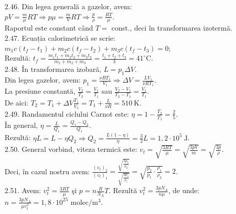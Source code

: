 2.46. Din legea generală a gazelor, avem:\\ $p V=\frac{m}{\mu} R T \Rightarrow p \mu=\frac{m}{V} R T \Rightarrow \frac{p}{\rho}=\frac{R T}{\mu}$.\\ Raportul este constant când $T=$ const., deci în transformarea izotermă.\\

2.47. Ecuația calorimetrică se scrie:\\ $m_{1} c\left(t_{f}-t_{1}\right)+m_{2} c\left(t_{f}-t_{2}\right)+m_{3} c\left(t_{f}-t_{3}\right)=0$;\\ Rezultă: $t_{f}=\frac{m_{1} t_{1}+m_{2} t_{2}+m_{3} t_{3}}{m_{1}+m_{2}+m_{3}}=\frac{t_{1}+t_{2}+t_{3}}{3}=41^{\circ} \mathrm{C}$.\\

2.48. În transformarea izobară, $L=p_{1} \Delta V$.\\ Din legea gazelor, avem: $p_{1}=\frac{\nu R T_{1}}{V_{1}} \Rightarrow \Delta V=\frac{L V_{1}}{\nu R T_{1}}$.\\ La presiune constantă, $\frac{V_{2}}{T_{2}}=\frac{V_{1}}{T_{1}}$ sau $\frac{V_{2}-V_{1}}{T_{2}-T_{1}}=\frac{V_{1}}{T_{1}}$.\\ De aici: $T_{2}=T_{1}+\Delta V \frac{T_{1}}{V_{1}}=T_{1}+\frac{L}{\nu R}=510 \mathrm{~K}$.\\

2.49. Randamentul ciclului Carnot este: $\eta=1-\frac{T_{2}}{T_{1}}=\frac{2}{5}$.\\ În general, $\eta=\frac{L}{Q_{1}}=\frac{Q_{1}-Q_{2}}{Q_{1}}$.\\ Rezultă: $\eta L=L-\eta Q_{2} \Rightarrow Q_{2}=\frac{L(1-\eta)}{\eta}=\frac{3}{2} L=1,2 \cdot 10^{5} \mathrm{~J}$.\\

2.50. General vorbind, viteza termică este: $v_{t}=\sqrt{\frac{3 R T}{\mu}}=\sqrt{\frac{3 p V}{m}}=\sqrt{\frac{3 p}{\rho}}$.\\ Deci, în cazul nostru avem: $\frac{\left(v_{t}\right)_{2}}{\left(v_{t}\right)_{1}}=\frac{\sqrt{\frac{3 p_{2}}{\rho_{2}}}}{\sqrt{\frac{3 p_{1}}{\rho_{1}}}}=\sqrt{\frac{p_{2}}{p_{1}} \cdot \frac{\rho_{1}}{\rho_{2}}}=2$.\\

2.51. Avem: $v_{t}^{2}=\frac{3 R T}{\mu}$ şi $p=n \frac{R}{N_{A}} T$. Rezultă $v_{t}^{2}=\frac{3 p N_{A}}{n \mu}$, de unde:\\ $n=\frac{3 p N_{A}}{\mu v_{t}^{2}}=1,8 \cdot 10^{25} \text { molec} / \mathrm{m}^{3}$.\\

